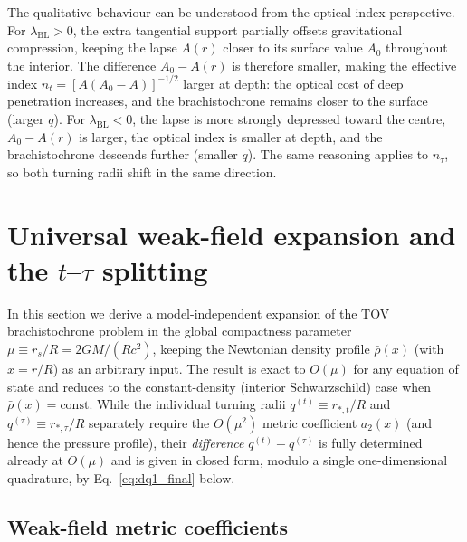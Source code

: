 \documentclass[
  aps,
  prd,
  twocolumn,
  nofootinbib,
  superscriptaddress,
  longbibliography
]{revtex4-2}
\begin{document}
The qualitative behaviour can be understood from the optical-index perspective.
For $\lambda_{\mathrm{BL}}>0$, the extra tangential support partially offsets gravitational compression, keeping the lapse $A(r)$ closer to its surface value $A_0$ throughout the interior.
The difference $A_0-A(r)$ is therefore smaller, making the effective index $n_t = [A(A_0-A)]^{-1/2}$ larger at depth: the optical cost of deep penetration increases, and the brachistochrone remains closer to the surface (larger $q$). For $\lambda_{\mathrm{BL}}<0$, the lapse is more strongly depressed toward the centre, $A_0-A(r)$ is larger, the optical index is smaller at depth, and the brachistochrone descends further (smaller $q$).
The same reasoning applies to $n_\tau$, so both turning radii shift in the same direction.

\section{Universal weak-field expansion and the $t$--$\tau$ splitting}
\label{sec:weak_field}

In this section we derive a model-independent expansion of the TOV
brachistochrone problem in the global compactness parameter
$\mu\equiv r_s/R=2GM/(Rc^2)$, keeping the Newtonian density profile
$\bar\rho(x)$ (with $x=r/R$) as an arbitrary input. The result is exact
to $O(\mu)$ for any equation of state and reduces to the
constant-density (interior Schwarzschild) case when $\bar\rho(x)=
\mathrm{const}$. While the individual turning radii $q^{(t)}\equiv
r_{*,t}/R$ and $q^{(\tau)}\equiv r_{*,\tau}/R$ separately require the
$O(\mu^2)$ metric coefficient $a_2(x)$ (and hence the pressure profile),
their \emph{difference} $q^{(t)}-q^{(\tau)}$ is fully determined already
at $O(\mu)$ and is given in closed form, modulo a single one-dimensional
quadrature, by Eq.~\eqref{eq:dq1_final} below.

\subsection{Weak-field metric coefficients}
\end{document}
